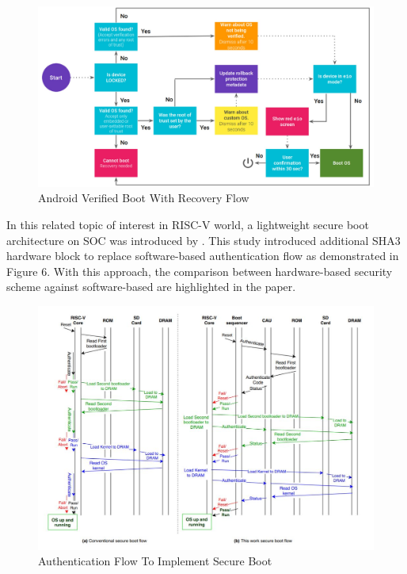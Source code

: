 \documentclass[review]{elsarticle}
\begin{document}
\begin{figure}[H]
	\centering
	\includegraphics[width=1\textwidth]{figs/AndroidVerifiedBootWithRecoveryFlow.JPG}
	\caption{Android Verified Boot With Recovery Flow \cite{R5:17}}
\end{figure}



In this related topic of interest in RISC-V world, a lightweight secure boot architecture on SOC was
introduced by \cite{R5:12}. This study
introduced additional SHA3 hardware block to replace software-based authentication flow as
demonstrated in Figure 6. With this approach, the comparison between hardware-based security
scheme against software-based are highlighted in the paper.

\begin{figure}[H]
	\includegraphics[width=1\textwidth]{figs/AuthenticationFlowToImplementSecureBoot.JPG}
	\caption{Authentication Flow To Implement Secure Boot \cite{R5:12}}
\end{figure}
\end{document}

